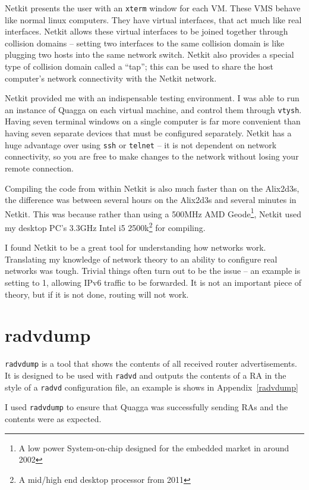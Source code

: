 \documentclass[12pt,a4paper,twoside]{report}
\begin{document}
Netkit presents the user with an \texttt{xterm} window for each VM\@. These VMS
behave like normal linux computers. They have virtual interfaces, that act much
like real interfaces. Netkit allows these virtual interfaces to be joined
together through collision domains -- setting two interfaces to the same
collision domain is like plugging two hosts into the same network switch.
Netkit also provides a special type of collision domain called a ``tap''; this
can be used to share the host computer's network connectivity with the Netkit
network.

Netkit provided me with an indispensable testing environment. I was able to run
an instance of Quagga on each virtual machine, and control them through
\texttt{vtysh}. Having seven terminal windows on a single computer is far more
convenient than having seven separate devices that must be configured
separately. Netkit has a huge advantage over using \texttt{ssh} or
\texttt{telnet} -- it is not dependent on network connectivity, so you are free
to make changes to the network without losing your remote connection.

Compiling the code from within Netkit is also much faster than on the Alix2d3s,
the difference was between several hours on the Alix2d3s and several minutes in
Netkit. This was because rather than using a 500MHz AMD Geode\footnote{A low
power System-on-chip designed for the embedded market in around 2002}, Netkit
used my desktop PC's 3.3GHz Intel i5 2500k\footnote{A mid/high end desktop
processor from 2011} for compiling. 

I found Netkit to be a great tool for understanding how networks work.
Translating my knowledge of network theory to an ability to configure real
networks was tough. Trivial things often turn out to be the issue -- an example
is setting  to 1, allowing IPv6
traffic to be forwarded. It is not an important piece of theory, but if it is
not done, routing will not work. 

\section{radvdump}
\texttt{radvdump} is a tool that shows the contents of all received router
advertisements. It is designed to be used with \texttt{radvd} and outputs the
contents of a RA in the style of a \texttt{radvd} configuration file, an
example is shows in Appendix~\ref{radvdump} 

I used \texttt{radvdump} to ensure that Quagga was successfully sending RAs and
the contents were as expected. 
\end{document}
